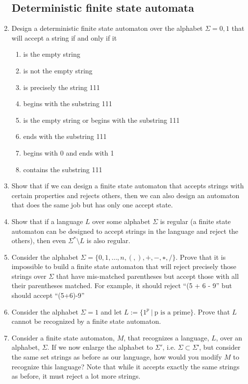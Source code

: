 \documentclass[a4paper]{article}
\begin{document}
\begin{enumerate}
\subsection{Deterministic finite state automata}
\item Design a deterministic finite state automaton over the alphabet $\Sigma={0,1}$ that will accept a string if and only if it
  \begin{enumerate}
    \item is the empty string
    \item is not the empty string
    \item is precisely the string 111
\item begins with the substring 111
\item is the empty string or begins with the substring 111
\item ends with the substring 111
\item begins with 0 and ends with 1
\item contains the substring 111 
  \end{enumerate}

 \item Show that if we can design a finite state automaton that accepts strings with certain properties and rejects others, then we can also design an automaton that does the same job but has only one accept state.

   \item Show that if a language $L$ over some alphabet $\Sigma$ is regular (a finite state automaton can be designed to accept strings in the language and reject the others), then even $\Sigma^* \setminus L$ is also regular. 

     \item Consider the alphabet $\Sigma=\{0,1,…,n,(,),+,−,∗,/\}$. Prove that it is impossible to build a finite state automaton that will reject precisely those strings over $\Sigma$ that have mis-matched parentheses but accept those with all their parentheses matched. For example, it should reject “(5 + 6 - 9” but should accept “(5+6)-9”

       \item Consider the alphabet $\Sigma={1}$ and let $L:=\{1^p \ |\ \textrm{p is a prime}\}$. Prove that $L$ cannot be recognized by a finite state automaton.

         \item Consider a finite state automaton, $M$, that recognizes a language, $L$, over an alphabet, $\Sigma$. If we now enlarge the alphabet to $\Sigma′$, i.e. $\Sigma⊂\Sigma$′, but consider the same set strings as before as our language, how would you modify $M$ to recognize this language? Note that while it accepts exactly the same strings as before, it must reject a lot more strings.


\end{enumerate}
\end{document}

